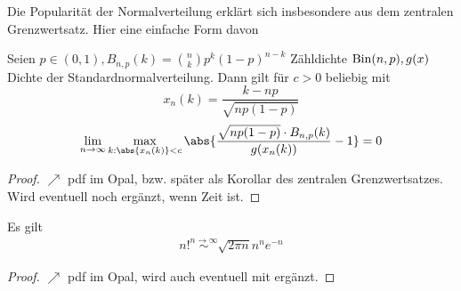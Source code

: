 Die Popularität der Normalverteilung erklärt sich insbesondere aus dem zentralen Grenzwertsatz. Hier eine einfache Form davon
\begin{proposition}
	Seien $p \in (0,1), B_{n,p}(k) = \binom{n}{k}p^k(1-p)^{n-k}$ Zähldichte $\operatorname{Bin}(n,p), g(x)$ Dichte der Standardnormalverteilung. Dann gilt für $c>0$ beliebig mit
	\[
		x_n(k) = \frac{k-np}{\sqrt{np(1-p)}}
	\]
	\begin{align*}
		\lim_{n\to \infty} \max_{k:\abs{x_n(k)} < c} \abs{\frac{\sqrt{np(1-p)}\cdot B_{n,p}(k)}{g(x_n(k))} -1} = 0
	\end{align*}
\end{proposition}
\begin{proof}
	$\nearrow$ pdf im Opal, bzw. später als Korollar des zentralen Grenzwertsatzes. Wird eventuell noch ergänzt, wenn Zeit ist.
\end{proof}
\begin{lemma}
	Es gilt 
	\begin{align*}
		n! \overset{n \to \infty}{\sim} \sqrt{2\pi n}n^n e^{-n}
	\end{align*}
\end{lemma}
\begin{proof}
	$\nearrow$ pdf im Opal, wird auch eventuell mit ergänzt.
\end{proof}